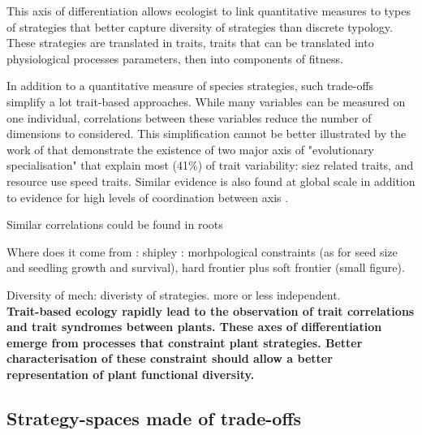 This axis of differentiation allows ecologist to link quantitative measures to types of strategies that better capture diversity of strategies than discrete typology. These strategies are translated in traits, traits that can be translated into physiological processes parameters, then into components of fitness.

In addition to a quantitative measure of species strategies, such trade-offs simplify a lot trait-based approaches. While many variables can be measured on one individual, correlations between these variables reduce the number of dimensions to considered. This simplification cannot be better illustrated by the work of \cite{diaz_plant_2004} that demonstrate the existence of two major axis of "evolutionary specialisation" that explain most (41\%) of trait variability: siez related traits, and resource use speed traits. Similar evidence is also found at global scale in addition to evidence for high levels of coordination between axis \parencite{diaz_global_2016}.


Similar correlations could be found in roots \cite{ ryser_importance_1996, reich_world-wide_2014}

Where does it come from : shipley : morhpological constraints (as for seed size and seedling growth and survival), hard frontier plus soft frontier (small figure).

Diversity of mech: diveristy of strategies. more or less independent.\\

\textbf{Trait-based ecology rapidly lead to the observation of trait correlations and trait syndromes between plants. These axes of differentiation emerge from processes that constraint plant strategies. Better characterisation of these constraint should allow a better representation of plant functional diversity.}

\subsection{Strategy-spaces made of trade-offs}

